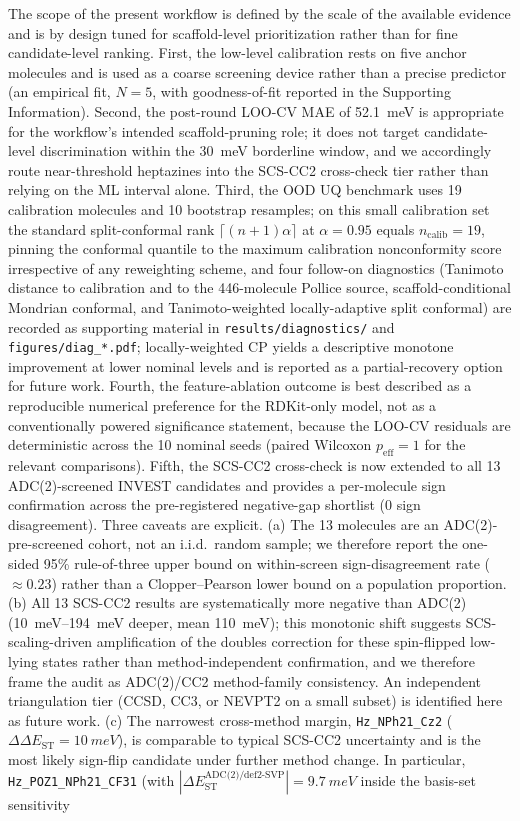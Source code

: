 \documentclass[journal=jcisd8,manuscript=article]{achemso}
\begin{document}
The scope of the present workflow is defined by the scale of the available evidence and is by design tuned for scaffold-level prioritization rather than for fine candidate-level ranking. First, the low-level calibration rests on five anchor molecules and is used as a coarse screening device rather than a precise predictor (an empirical fit, $N=5$, with goodness-of-fit reported in the Supporting Information). Second, the post-round LOO-CV MAE of \SI{52.1}{meV} is appropriate for the workflow's intended scaffold-pruning role; it does not target candidate-level discrimination within the \SI{30}{meV} borderline window, and we accordingly route near-threshold heptazines into the SCS-CC2 cross-check tier rather than relying on the ML interval alone. Third, the OOD UQ benchmark uses 19 calibration molecules and 10 bootstrap resamples; on this small calibration set the standard split-conformal rank $\lceil(n+1)\alpha\rceil$ at $\alpha=0.95$ equals $n_\text{calib}=19$, pinning the conformal quantile to the maximum calibration nonconformity score irrespective of any reweighting scheme\cite{Vovk2005}, and four follow-on diagnostics (Tanimoto distance to calibration and to the 446-molecule Pollice source\cite{Whitehead2026}, scaffold-conditional Mondrian conformal\cite{Bostrom2020}, and Tanimoto-weighted locally-adaptive split conformal\cite{Tibshirani2019}) are recorded as supporting material in \texttt{results/diagnostics/} and \texttt{figures/diag\_*.pdf}; locally-weighted CP yields a descriptive monotone improvement at lower nominal levels and is reported as a partial-recovery option for future work. Fourth, the feature-ablation outcome is best described as a reproducible numerical preference for the RDKit-only model, not as a conventionally powered significance statement, because the LOO-CV residuals are deterministic across the 10 nominal seeds (paired Wilcoxon $p_\text{eff}=1$ for the relevant comparisons). Fifth, the SCS-CC2 cross-check is now extended to all 13 ADC(2)-screened INVEST candidates and provides a per-molecule sign confirmation across the pre-registered negative-gap shortlist (0 sign disagreement). Three caveats are explicit. (a) The 13 molecules are an ADC(2)-pre-screened cohort, not an i.i.d.\ random sample; we therefore report the one-sided 95\% rule-of-three upper bound on within-screen sign-disagreement rate ($\approx 0.23$) rather than a Clopper--Pearson lower bound on a population proportion. (b) All 13 SCS-CC2 results are systematically more negative than ADC(2) (\SIrange{10}{194}{meV} deeper, mean \SI{110}{meV}); this monotonic shift suggests SCS-scaling-driven amplification of the doubles correction for these spin-flipped low-lying states\cite{Hellweg2008,Tajti2009} rather than method-independent confirmation, and we therefore frame the audit as ADC(2)/CC2 method-family consistency. An independent triangulation tier (CCSD, CC3, or NEVPT2 on a small subset) is identified here as future work. (c) The narrowest cross-method margin, \texttt{Hz\_NPh21\_Cz2} ($\Delta\Delta E_\mathrm{ST}=\SI{10}{meV}$), is comparable to typical SCS-CC2 uncertainty and is the most likely sign-flip candidate under further method change. In particular, \texttt{Hz\_POZ1\_NPh21\_CF31} (with $|\Delta E_\mathrm{ST}^\text{ADC(2)/def2-SVP}|=\SI{9.7}{meV}$ inside the basis-set sensitivity 
\end{document}
